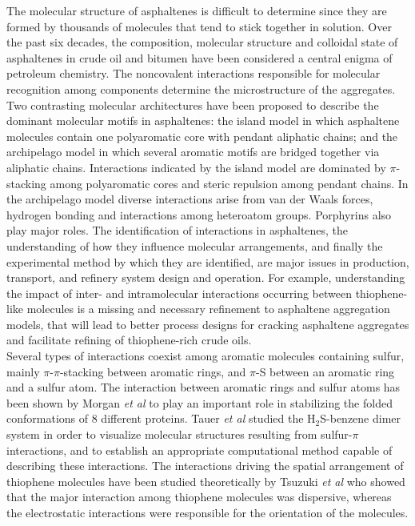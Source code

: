 	The molecular structure of asphaltenes is difficult to determine since they are formed by thousands of molecules that tend to stick together in solution. Over the past six decades, the composition, molecular structure and colloidal state of asphaltenes in crude oil and bitumen have been considered a central enigma of petroleum chemistry.\cite{speight2014chemistry} The noncovalent interactions responsible for molecular recognition among components determine the microstructure of the aggregates. Two contrasting molecular architectures have been proposed to describe the dominant molecular motifs in asphaltenes: the island model in which asphaltene molecules contain one polyaromatic core with pendant aliphatic chains; and the archipelago model in which several aromatic motifs are bridged together via aliphatic chains.\cite{mullins2012advances,sheremata2004quantitative} Interactions indicated by the island model are dominated by $\pi$-stacking among polyaromatic cores and steric repulsion among pendant chains. In the archipelago model diverse interactions arise from van der Waals forces, hydrogen bonding and interactions among heteroatom groups. Porphyrins also play major roles. The identification of interactions in asphaltenes, the understanding of how they influence molecular arrangements, and finally the experimental method by which they are identified, are major issues in production, transport, and refinery system design and operation.\cite{speight1999desulfurization} For example, understanding the impact of inter- and intramolecular interactions occurring between thiophene-like molecules is a missing and necessary refinement to asphaltene aggregation models,\cite{groenzin1999asphaltene,mackie2010importance,mullins2012advances} that will lead to better process designs for cracking asphaltene aggregates and facilitate refining of thiophene-rich crude oils.\\
	
	Several types of interactions coexist among aromatic molecules containing sulfur, mainly $\pi$-$\pi$-stacking between aromatic rings, and $\pi$-S between an aromatic ring and a sulfur atom. The interaction between aromatic rings and sulfur atoms has been shown by Morgan \textit{et al}\cite{morgan1978chains}  to play an important role in stabilizing the folded conformations of 8 different proteins. Tauer \textit{et al}\cite{tauer2005estimates} studied the H$_{2}$S-benzene dimer system in order to visualize molecular structures resulting from sulfur-$\pi$ interactions, and to establish an appropriate computational method capable of describing these interactions. The interactions driving the spatial arrangement of thiophene molecules have been studied theoretically by Tsuzuki \textit{et al}\cite{tsuzuki2002model} who showed that the major interaction among thiophene molecules was dispersive, whereas the electrostatic interactions were responsible for the orientation of the molecules.\\
	
